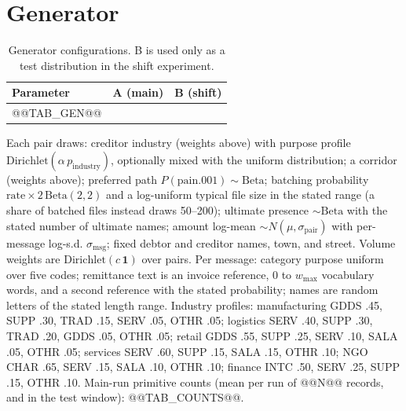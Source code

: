 \documentclass[conference]{IEEEtran}
\begin{document}
\section{Generator}
\begin{table}[h]\caption{Generator configurations. B is used only as a test distribution in the shift experiment.}\label{tab:gen}\centering\scriptsize
\begin{tabularx}{\columnwidth}{@{}Xcc@{}}\toprule
Parameter & A (main) & B (shift) \\\midrule
@@TAB_GEN@@
\bottomrule\end{tabularx}\end{table}
Each pair draws: creditor industry (weights above) with purpose profile
$\mathrm{Dirichlet}(\alpha\,p_{\mathrm{industry}})$, optionally mixed with the
uniform distribution; a corridor (weights above); preferred path
$P(\text{pain.001})\sim\mathrm{Beta}$; batching probability
$\text{rate}\times 2\,\mathrm{Beta}(2,2)$ and a log-uniform typical file size
in the stated range (a share of batched files instead draws 50--200); ultimate
presence $\sim\mathrm{Beta}$ with the stated number of ultimate names; amount
log-mean $\sim N(\mu,\sigma_{\mathrm{pair}})$ with per-message log-s.d.
$\sigma_{\mathrm{msg}}$; fixed debtor and creditor names, town, and street.
Volume weights are $\mathrm{Dirichlet}(c\,\mathbf{1})$ over pairs. Per message:
category purpose uniform over five codes; remittance text is an invoice
reference, 0 to $w_{\max}$ vocabulary words, and a second reference with the
stated probability; names are random letters of the stated length range.
Industry profiles: manufacturing GDDS .45, SUPP .30, TRAD .15, SERV .05, OTHR
.05; logistics SERV .40, SUPP .30, TRAD .20, GDDS .05, OTHR .05; retail GDDS
.55, SUPP .25, SERV .10, SALA .05, OTHR .05; services SERV .60, SUPP .15, SALA
.15, OTHR .10; NGO CHAR .65, SERV .15, SALA .10, OTHR .10; finance INTC .50,
SERV .25, SUPP .15, OTHR .10. Main-run primitive counts (mean per run of
@@N@@ records, and in the test window): @@TAB_COUNTS@@.
\end{document}
